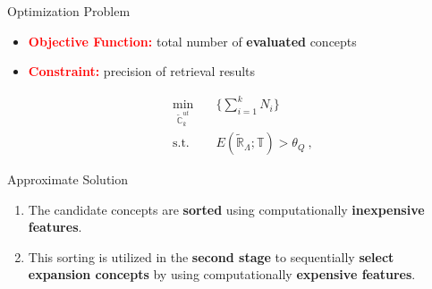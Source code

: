 \documentclass[final]{beamer}
\newlength{\onecolwid}
\begin{document}
\begin{frame}[t]
\begin{columns}[t]
\begin{column}{\onecolwid}
\begin{block}{Optimization Problem}
\begin{itemize}
\item \textcolor{red}{\textbf{Objective Function:}} total number of \textbf{evaluated} concepts 

\item \textcolor{red}{\textbf{Constraint:}}
precision of retrieval results


\begin{align*}\label{eq:opt}
\min_{\mathbb{\tilde C}_{k}^{ut}}\quad&\bigg\{\sum_{i=1}^k{N_i}\bigg\}\nonumber\\
\text{s.t.}\quad& E(\mathbb{\tilde R}_\Lambda;\mathbb{T})>\theta_Q\ ,
\end{align*}
\end{itemize}
\end{block}



\begin{block}{Approximate Solution} 
\begin{enumerate}
\item The candidate
concepts are \textbf{sorted} using  computationally \textbf{inexpensive features}.

\item This sorting is utilized in the \textbf{second stage} to sequentially \textbf{select expansion concepts} by using computationally \textbf{expensive
features}.

\end{enumerate}


\end{block}
\end{column}
\end{columns}
\end{frame}
\end{document}
